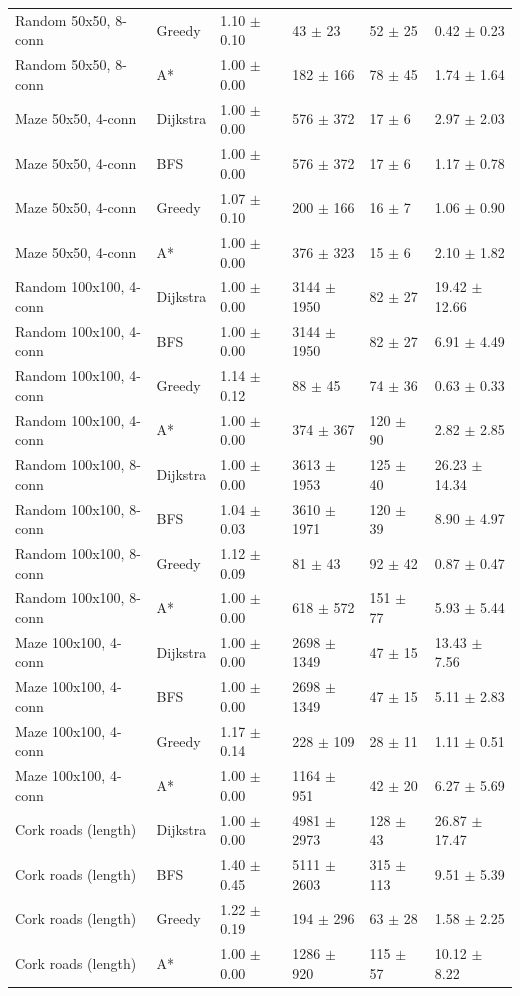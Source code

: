\begin{tabular}{llllll}
Random 50x50, 8-conn & Greedy & 1.10 $\pm$ 0.10 & 43 $\pm$ 23 & 52 $\pm$ 25 & 0.42 $\pm$ 0.23 \\
Random 50x50, 8-conn & A* & 1.00 $\pm$ 0.00 & 182 $\pm$ 166 & 78 $\pm$ 45 & 1.74 $\pm$ 1.64 \\
Maze 50x50, 4-conn & Dijkstra & 1.00 $\pm$ 0.00 & 576 $\pm$ 372 & 17 $\pm$ 6 & 2.97 $\pm$ 2.03 \\
Maze 50x50, 4-conn & BFS & 1.00 $\pm$ 0.00 & 576 $\pm$ 372 & 17 $\pm$ 6 & 1.17 $\pm$ 0.78 \\
Maze 50x50, 4-conn & Greedy & 1.07 $\pm$ 0.10 & 200 $\pm$ 166 & 16 $\pm$ 7 & 1.06 $\pm$ 0.90 \\
Maze 50x50, 4-conn & A* & 1.00 $\pm$ 0.00 & 376 $\pm$ 323 & 15 $\pm$ 6 & 2.10 $\pm$ 1.82 \\
Random 100x100, 4-conn & Dijkstra & 1.00 $\pm$ 0.00 & 3144 $\pm$ 1950 & 82 $\pm$ 27 & 19.42 $\pm$ 12.66 \\
Random 100x100, 4-conn & BFS & 1.00 $\pm$ 0.00 & 3144 $\pm$ 1950 & 82 $\pm$ 27 & 6.91 $\pm$ 4.49 \\
Random 100x100, 4-conn & Greedy & 1.14 $\pm$ 0.12 & 88 $\pm$ 45 & 74 $\pm$ 36 & 0.63 $\pm$ 0.33 \\
Random 100x100, 4-conn & A* & 1.00 $\pm$ 0.00 & 374 $\pm$ 367 & 120 $\pm$ 90 & 2.82 $\pm$ 2.85 \\
Random 100x100, 8-conn & Dijkstra & 1.00 $\pm$ 0.00 & 3613 $\pm$ 1953 & 125 $\pm$ 40 & 26.23 $\pm$ 14.34 \\
Random 100x100, 8-conn & BFS & 1.04 $\pm$ 0.03 & 3610 $\pm$ 1971 & 120 $\pm$ 39 & 8.90 $\pm$ 4.97 \\
Random 100x100, 8-conn & Greedy & 1.12 $\pm$ 0.09 & 81 $\pm$ 43 & 92 $\pm$ 42 & 0.87 $\pm$ 0.47 \\
Random 100x100, 8-conn & A* & 1.00 $\pm$ 0.00 & 618 $\pm$ 572 & 151 $\pm$ 77 & 5.93 $\pm$ 5.44 \\
Maze 100x100, 4-conn & Dijkstra & 1.00 $\pm$ 0.00 & 2698 $\pm$ 1349 & 47 $\pm$ 15 & 13.43 $\pm$ 7.56 \\
Maze 100x100, 4-conn & BFS & 1.00 $\pm$ 0.00 & 2698 $\pm$ 1349 & 47 $\pm$ 15 & 5.11 $\pm$ 2.83 \\
Maze 100x100, 4-conn & Greedy & 1.17 $\pm$ 0.14 & 228 $\pm$ 109 & 28 $\pm$ 11 & 1.11 $\pm$ 0.51 \\
Maze 100x100, 4-conn & A* & 1.00 $\pm$ 0.00 & 1164 $\pm$ 951 & 42 $\pm$ 20 & 6.27 $\pm$ 5.69 \\
Cork roads (length) & Dijkstra & 1.00 $\pm$ 0.00 & 4981 $\pm$ 2973 & 128 $\pm$ 43 & 26.87 $\pm$ 17.47 \\
Cork roads (length) & BFS & 1.40 $\pm$ 0.45 & 5111 $\pm$ 2603 & 315 $\pm$ 113 & 9.51 $\pm$ 5.39 \\
Cork roads (length) & Greedy & 1.22 $\pm$ 0.19 & 194 $\pm$ 296 & 63 $\pm$ 28 & 1.58 $\pm$ 2.25 \\
Cork roads (length) & A* & 1.00 $\pm$ 0.00 & 1286 $\pm$ 920 & 115 $\pm$ 57 & 10.12 $\pm$ 8.22 \\
\bottomrule
\end{tabular}
